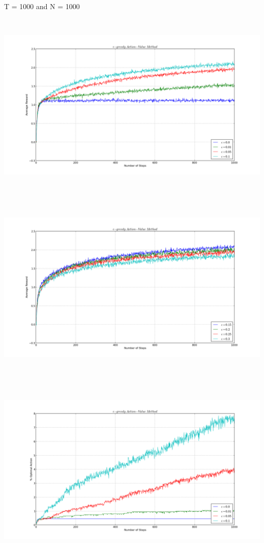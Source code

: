 \documentclass[a4paper,10pt]{report}
\newenvironment{my_itemize}{
\begin{itemize}
  \setlength{\itemsep}{1pt}
  \setlength{\parskip}{0pt}
  \setlength{\parsep}{0pt}}{
\end{itemize}}
\begin{document}
\begin{my_itemize}
\begin{center}
\end{center}
\pagebreak
\item T = 1000 and N = 1000
\begin{center}
\centerline{\includegraphics*[width=180mm, height=90mm]{EpsRew-1000-1000.png}}
\centerline{\includegraphics*[width=180mm, height=90mm]{EpsRew1-1000-1000.png}}
\end{center}
\begin{center}
\centerline{\includegraphics*[width=180mm, height=90mm]{EpsOpt-1000-1000.png}}

\end{center}
\end{my_itemize}
\end{document}
